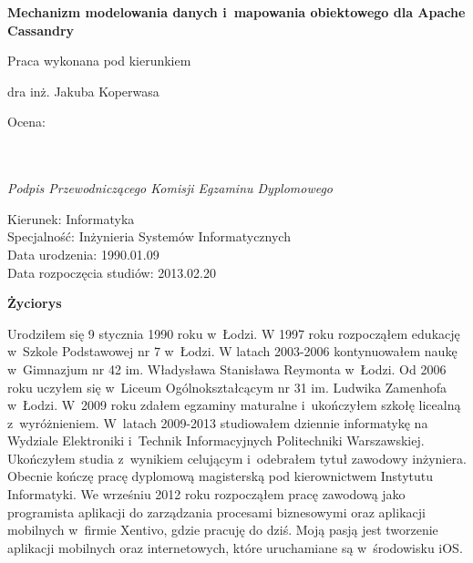 \begin{titlepage}
\begin{center}
  \textbf{Mechanizm modelowania danych i~mapowania obiektowego dla Apache Cassandry}
 \end{center}
 
 \vspace{1.5cm}
 
 \hfill Praca wykonana pod kierunkiem
 
 \hfill dra inż. Jakuba Koperwasa
 
 \vspace{1.5cm}

 \begin{flushleft}
  \begin{minipage}{7cm}
   Ocena: \dotfill \\ \\
   \hspace*{0cm} \dotfill \\[-0.7cm]
   \begin{center}
    \small\textit{Podpis Przewodniczącego Komisji Egzaminu Dyplomowego}
   \end{center}
  \end{minipage}
 \end{flushleft}

\end{titlepage}


\newpage
\thispagestyle{empty}

\begin{flushright}
  Kierunek: Informatyka \\
  Specjalność: Inżynieria Systemów Informatycznych \\
  Data urodzenia: 1990.01.09 \\
  Data rozpoczęcia studiów: 2013.02.20 \\
\end{flushright}

\vspace{0.5cm}

\begin{center}
  \textbf{\textbf{Życiorys}}
\end{center}

\vspace{0.5cm}
 
Urodziłem się 9 stycznia 1990 roku w~Łodzi. W 1997 roku rozpocząłem edukację w~Szkole Podstawowej nr 7 w~Łodzi. W latach 2003-2006 kontynuowałem naukę w~Gimnazjum nr 42 im. Władysława Stanisława Reymonta w~Łodzi. Od 2006 roku uczyłem się w~Liceum Ogólnokształcącym nr 31 im. Ludwika Zamenhofa w~Łodzi. W~2009 roku zdałem egzaminy maturalne i~ukończyłem szkołę licealną z~wyróżnieniem. W~latach 2009-2013 studiowałem dziennie informatykę na Wydziale Elektroniki i~Technik Informacyjnych Politechniki Warszawskiej. Ukończyłem studia z~wynikiem celującym i~odebrałem tytuł zawodowy inżyniera. Obecnie kończę pracę dyplomową magisterską pod kierownictwem Instytutu Informatyki. We wrześniu 2012 roku rozpocząłem pracę zawodową jako programista aplikacji do zarządzania procesami biznesowymi oraz aplikacji mobilnych w~firmie Xentivo, gdzie pracuję do dziś. Moją pasją jest tworzenie aplikacji mobilnych oraz internetowych, które uruchamiane są w~środowisku iOS.
 
